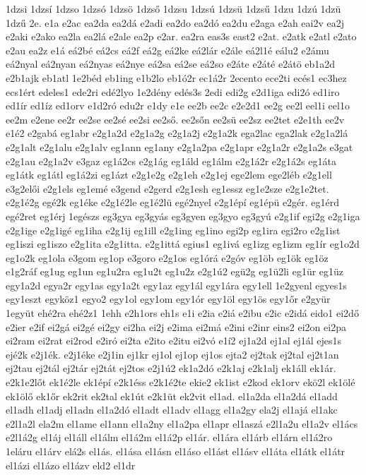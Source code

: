 {1dzsi
1dzsí
1dzso
1dzsó
1dzsö
1dzső
1dzsu
1dzsú
1dzsü
1dzsű
1dzu
1dzú
1dzü
1dzű
2e.
e1a
e2ac
ea2da
ea2dá
e2adi
ea2do
ea2dó
ea2du
e2aga
e2ah
eai2v
ea2j
e2aki
e2ako
ea2la
ea2lá
e2ale
ea2p
e2ar.
ea2ra
eas3s
east2
e2at.
e2atk
e2atl
e2ato
e2au
ea2z
e1á
eá2bé
eá2cs
eá2f
eá2g
eá2ke
eá2lár
e2ále
eá2l1é
eálu2
e2ámu
eá2nyal
eá2nyan
eá2nyas
eá2nye
eá2sa
eá2se
eá2so
e2áte
e2áté
e2átö
eb1a2d
e2b1ajk
eb1atl
1e2béd
eb1ing
e1b2lo
eb1ó2r
ec1á2r
2ecento
ece2ti
ecés1
ec3hez
ecs1ért
edeles1
ede2ri
edé2lyo
1e2dény
edés3s
2edi
edi2g
e2d1iga
edi2ó
ed1iro
ed1ír
ed1íz
ed1orv
e1d2ró
edu2r
e1dy
e1e
ee2b
ee2c
e2e2d1
ee2g
ee2l
eel1i
eel1o
ee2m
e2ene
ee2r
ee2se
ee2sé
ee2si
ee2ső.
ee2sőn
ee2sü
ee2sz
ee2tet
e2e1th
ee2v
e1é2
e2gabá
eg1abr
e2g1a2d
e2g1a2g
e2g1a2j
e2g1a2k
ega2lac
ega2lak
e2g1a2lá
e2g1alt
e2g1alu
e2g1alv
eg1ann
eg1any
e2g1a2pa
e2g1apr
e2g1a2r
e2g1a2s
e3gat
e2g1au
e2g1a2v
e3gaz
eg1á2cs
e2g1ág
eg1áld
eg1álm
e2g1á2r
e2g1á2s
eg1áta
eg1átk
eg1átl
eg1á2zi
eg1ázt
e2g1e2g
e2g1eh
e2g1ej
ege2lem
ege2léb
e2g1ell
e3g2elői
e2g1els
eg1emé
e3gend
e2gerd
e2g1esh
eg1essz
eg1e2sze
e2g1e2tet.
e2g1é2g
egé2k
eg1éke
e2g1é2le
eg1é2lü
egé2nyel
e2g1épí
eg1épü
e2gér.
eg1érd
egé2ret
eg1érj
1egészs
eg3gya
eg3gyás
eg3gyen
eg3gyo
eg3gyú
e2g1if
egi2g
e2g1iga
e2g1ige
e2g1igé
eg1iha
e2g1ij
eg1ill
e2g1ing
eg1ino
egi2p
eg1ira
egi2ro
e2g1ist
eg1iszi
eg1iszo
e2g1ita
e2g1itta.
e2g1ittá
egius1
eg1ivá
eg1izg
eg1izm
eg1ír
eg1o2d
eg1o2k
eg1ola
e3gom
eg1op
e3goro
e2g1os
eg1órá
e2góv
eg1öb
eg1ök
eg1öz
e1g2ráf
eg1ug
eg1un
eg1u2ra
eg1u2t
eg1u2z
e2g1ú2
egü2g
eg1ü2li
eg1ür
eg1üz
egy1a2d
egya2r
egy1as
egy1a2t
egy1az
egy1ál
egy1ára
egy1ell
1e2gyenl
egyes1s
egy1eszt
egyköz1
egyo2
egy1ol
egy1om
egy1ór
egy1öl
egy1ös
egy1őr
e2gyür
1együt
ehé2ra
ehé2z1
1ehh
e2h1ors
eh1s
e1i
e2ia
e2iá
e2ibu
e2ic
e2idá
eido1
ei2dő
e2ier
e2if
ei2gá
ei2gé
ei2gy
ei2ha
ei2j
e2ima
ei2má
e2ini
e2inr
eins2
ei2on
ei2pa
ei2ram
ei2rat
ei2rod
e2iró
ei2ta
e2ito
e2itu
ei2vó
e1í2
ej1a2d
ej1al
ej1ál
ejes1s
ejé2k
e2j1ék.
e2j1éke
e2j1in
ej1kr
ej1ol
ej1op
ej1os
ejta2
ej2tak
ej2tal
ej2t1an
ej2tau
ej2tál
ej2tár
ej2tát
ej2tos
e2j1ú2
ek1a2dó
e2k1aj
e2k1alj
ek1áll
ek1ár.
e2k1e2lőt
ek1é2le
ek1épí
e2k1éss
e2k1é2te
ekie2
ek1ist
e2kod
ek1orv
ekö2l
ek1ölé
ek1ölő
ek1őr
ek2rit
ek2tal
ek1út
e2k1üt
ek2vit
el1ad.
el1a2da
el1a2dá
el1add
el1adh
el1adj
el1adn
el1a2dó
el1adt
el1adv
el1agg
el1a2gy
ela2j
el1ajá
el1akc
e2l1a2l
ela2m
el1ame
el1ann
el1a2ny
el1a2pa
el1apr
el1aszá
e2l1a2u
el1a2v
el1ács
e2l1á2g
el1áj
el1áll
el1álm
el1á2m
el1á2p
el1ár.
el1ára
el1árb
el1árn
el1á2ro
1eláru
el1árv
elá2s
el1ás.
el1ása
el1ásn
el1áso
el1ást
el1ásv
el1áta
el1átk
el1átr
el1ázi
el1ázo
el1ázv
eld2
el1dr
}
